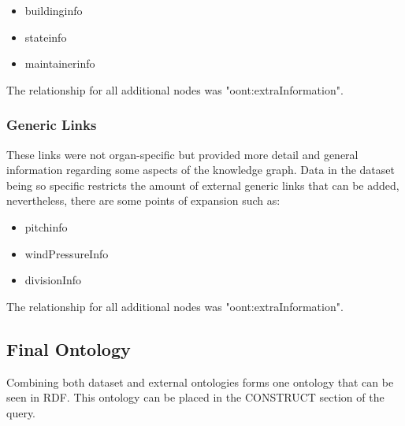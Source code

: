 \vspace{-0.15cm}
\begin{itemize}
    \itemsep0em 
    \vspace{-0.05cm}
    \item buildinginfo
    \vspace{-0.05cm}
    \item stateinfo
    \vspace{-0.05cm}
    \item maintainerinfo
    \vspace{-0.05cm}
\end{itemize}
\vspace{-0.1cm}

\noindent The relationship for all additional nodes was "oont:extraInformation".

\subsubsection{Generic Links}
\hspace*{0.5cm} These links were not organ-specific but provided more detail and general information regarding some aspects of the knowledge graph. Data in the dataset being so specific restricts the amount of external generic links that can be added, nevertheless, there are some points of expansion such as:

\vspace{-0.15cm}
\begin{itemize}
    \itemsep0em 
    \vspace{-0.05cm}
    \item pitchinfo
    \vspace{-0.05cm}
    \item windPressureInfo
    \vspace{-0.05cm}
    \item divisionInfo
    \vspace{-0.1cm}
\end{itemize}
\vspace{-0.1cm}

\noindent The relationship for all additional nodes was "oont:extraInformation".

\subsection{Final Ontology}
\hspace*{0.5cm} Combining both dataset and external ontologies forms one ontology that can be seen in RDF. This ontology can be placed in the CONSTRUCT section of the query.

